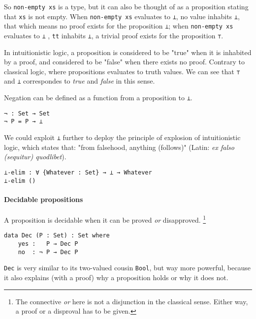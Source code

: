 \documentclass[../thesis.tex]{subfiles}
\begin{document}
So {\lstinline|non-empty xs|} is a type, but it can also be thought of as a
proposition stating that {\lstinline|xs|} is not empty.
When {\lstinline|non-empty xs|} evaluates to {\lstinline|⊥|}, no value inhabits
{\lstinline|⊥|}, that {\scm which} means no proof exists for the proposition {\lstinline|⊥|};
when {\lstinline|non-empty xs|} evaluates to {\lstinline|⊥|} , {\lstinline|tt|}
inhabits {\lstinline|⊥|}, a trivial proof exists for the proposition {\lstinline|⊤|}.

In intuitionistic logic, a proposition is considered to be "true" when it is
inhabited by a proof, and considered to be "false" when there exists no proof.
Contrary to classical logic, where propositions evaluates to truth values. 
We can see that {\lstinline|⊤|} and {\lstinline|⊥|} correspondes to \textit{true}
and \textit{false} in this sense.

Negation can be defined as a function from a proposition to {\lstinline|⊥|}.

\begin{lstlisting}
¬ : Set → Set
¬ P = P → ⊥
\end{lstlisting}

We could exploit {\lstinline|⊥|} further to deploy the principle of explosion
of intuitionistic logic, which states that: "from falsehood, anything (follows)"
(Latin: \textit{ex falso (sequitur) quodlibet}).

\begin{lstlisting}
⊥-elim : ∀ {Whatever : Set} → ⊥ → Whatever
⊥-elim ()
\end{lstlisting}


\paragraph{Decidable propositions}

A proposition is decidable when it can be proved \textit{or} disapproved.
\footnote{The connective \textit{or} here is not a disjunction in the classical sense.
Either way, a proof or a disproval has to be given.}

\begin{lstlisting}
data Dec (P : Set) : Set where
    yes :   P → Dec P
    no  : ¬ P → Dec P
\end{lstlisting}

{\lstinline|Dec|} is very similar to its two-valued cousin {\lstinline|Bool|},
but way more powerful, because it also explains (with a proof) why a proposition
holds or why it does not.
\end{document}
